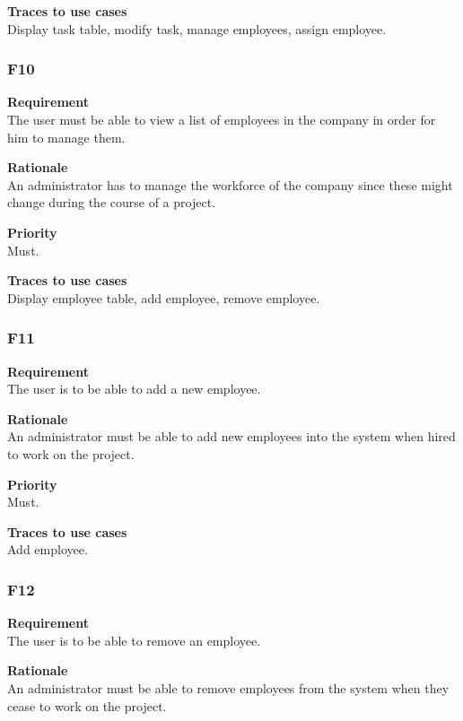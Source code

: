 \documentclass[12pt]{article}
\begin{document}
\noindent
{\bf Traces to use cases}\\
Display task table, modify task, manage employees, assign employee.

\subsubsection{F10} \label{uc:10}

\noindent
{\bf Requirement}\\
The user must be able to view a list of employees in the company in order for him to manage them.

\noindent
{\bf Rationale}\\
An administrator has to manage the workforce of the company since these might change during the course of a project.

\noindent
{\bf Priority}\\
Must.

\noindent
{\bf Traces to use cases}\\
Display employee table, add employee, remove employee.

\subsubsection{F11} \label{uc:11}

\noindent
{\bf Requirement}\\
The user is to be able to add a new employee.

\noindent
{\bf Rationale}\\
An administrator must be able to add new employees into the system when hired to work on the project.

\noindent
{\bf Priority}\\
Must.

\noindent
{\bf Traces to use cases}\\
Add employee.

\subsubsection{F12} \label{uc:12}

\noindent
{\bf Requirement}\\
The user is to be able to remove an employee.

\noindent
{\bf Rationale}\\
An administrator must be able to remove employees from the system when they cease to work on the project.
\end{document}
